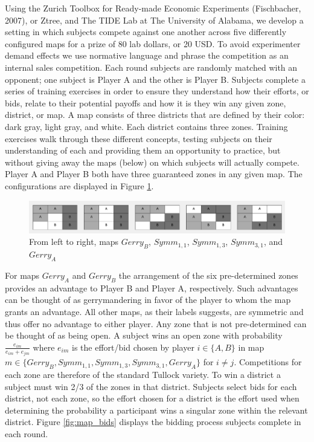\documentclass[AER]{AEA}
\begin{document}
Using the Zurich Toolbox for Ready-made Economic Experiments (Fischbacher, 2007), or Ztree, and The TIDE Lab at The University of Alabama, we develop a setting in which subjects compete against one another across five differently configured maps for a prize of 80 lab dollars, or 20 USD. To avoid experimenter demand effects we use normative language and phrase the competition as an internal sales competition. Each round subjects are randomly matched with an opponent; one subject is Player A and the other is Player B. Subjects complete a series of training exercises in order to ensure they understand how their efforts, or bids, relate to their potential payoffs and how it is they win any given zone, district, or map. A map consists of three districts that are defined by their color: dark gray, light gray, and white. Each district contains three zones. Training exercises walk through these different concepts, testing subjects on their understanding of each and providing them an opportunity to practice, but without giving away the maps (below) on which subjects will actually compete. Player A and Player B both have three guaranteed zones in any given map. The configurations are displayed in Figure \ref{fig:maps}.
\begin{figure}[h]
\centering
\includegraphics[scale=0.4]{maps.png}
\caption{From left to right, maps $Gerry_B$, $Symm_{1,1}$, $Symm_{1,3}$, $Symm_{3,1}$, and $Gerry_A$}
\label{fig:maps}
\end{figure}
For maps $Gerry_A$ and $Gerry_B$ the arrangement of the six pre-determined zones provides an advantage to Player B and Player A, respectively. Such advantages can be thought of as gerrymandering in favor of the player to whom the map grants an advantage. All other maps, as their labels suggests, are symmetric and thus offer no advantage to either player. Any zone that is not pre-determined can be thought of as being open. A subject wins an open zone with probability $\frac{e_{im}}{e_{im}+e_{jm}}$ where $e_{im}$ is the effort/bid chosen by player $i \in \{A,B\}$ in map $m \in \{Gerry_B, Symm_{1,1}, Symm_{1,3}, Symm_{3,1}, Gerry_A\}$ for $i \not= j$. Competitions for each zone are therefore of the standard Tullock variety. To win a district a subject must win 2/3 of the zones in that district. Subjects select bids for each district, not each zone, so the effort chosen for a district is the effort used when determining the probability a participant wins a singular zone within the relevant district. Figure \ref{fig:map_bids} displays the bidding process subjects complete in each round.
\end{document}
